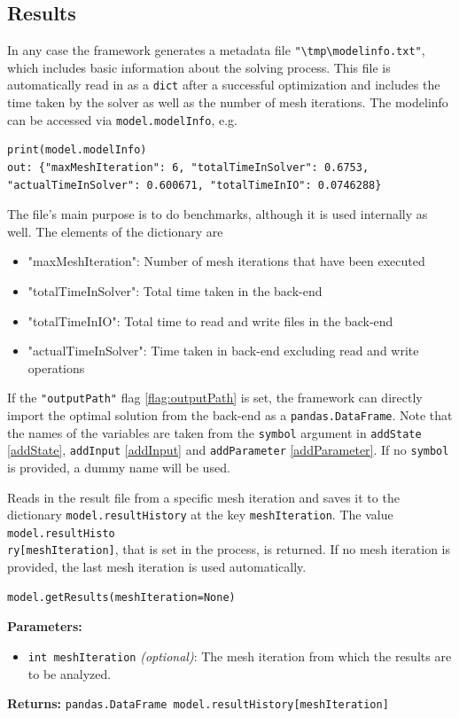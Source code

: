 \documentclass[12pt]{article}
\begin{document}
\subsection{Results}
\label{c:Results}
In any case the framework generates a metadata file \texttt{"\textbackslash tmp\textbackslash modelinfo.txt"}, which includes basic information about the solving process. This file is automatically read in as a \texttt{dict} after a successful optimization and includes the time taken by the solver as well as the number of mesh iterations. The modelinfo can be accessed via \texttt{model.modelInfo}, e.g.
\begin{lstlisting}
print(model.modelInfo)
out: {"maxMeshIteration": 6, "totalTimeInSolver": 0.6753, "actualTimeInSolver": 0.600671, "totalTimeInIO": 0.0746288}
\end{lstlisting}
The file's main purpose is to do benchmarks, although it is used internally as well. The elements of the dictionary are
\begin{itemize}
\item "maxMeshIteration": Number of mesh iterations that have been executed
\item "totalTimeInSolver": Total time taken in the back-end
\item "totalTimeInIO": Total time to read and write files in the back-end
\item "actualTimeInSolver": Time taken in back-end excluding read and write operations
\end{itemize}

If the \texttt{"outputPath"} flag \eqref{flag:outputPath} is set, the framework can directly import the optimal solution from the back-end as a \texttt{pandas.DataFrame}. Note that the names of the variables are taken from the \texttt{symbol} argument in \texttt{addState} \eqref{addState}, \texttt{addInput} \eqref{addInput} and  \texttt{addParameter} \eqref{addParameter}. If no \texttt{symbol} is provided, a dummy name will be used.

\begin{mdframed}[backgroundcolor=gray!10, roundcorner=10pt,
		linewidth=1pt]
	
	Reads in the result file from a specific mesh iteration and saves it to the dictionary \texttt{model.resultHistory} at the key \texttt{meshIteration}. The value \texttt{model.resultHisto\\ ry[meshIteration]}, that is set in the process, is returned. If no mesh iteration is provided, the last mesh iteration is used automatically.
 
	\begin{lstlisting}
model.getResults(meshIteration=None)
		\end{lstlisting}
	\label{getResults}
	\textbf{Parameters:}
	\begin{itemize}
		\item \texttt{int meshIteration} \emph{(optional)}: The mesh iteration from which the results are to be analyzed. 
	\end{itemize}
	
	\textbf{Returns:} \texttt{pandas.DataFrame model.resultHistory[meshIteration]}

\end{mdframed}
\end{document}
